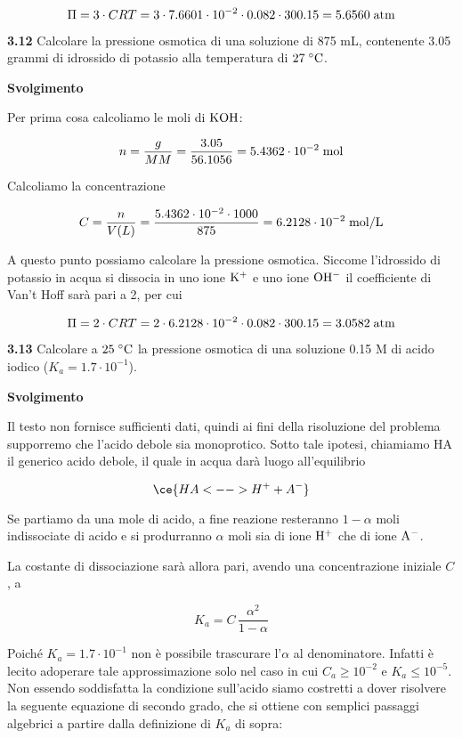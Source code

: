 $$\Pi=3 \cdot CRT
=3 \cdot 7.6601 \cdot 10^{-2} \cdot 0.082 \cdot 300.15
=5.6560 \; \rm atm$$

\vspace{0.2cm}\textbf{3.12} Calcolare la pressione osmotica di una soluzione di 875 mL, contenente 3.05 grammi di idrossido
di potassio alla temperatura di $27 \; \rm ^{\circ} C$.

\vspace{0.2cm}\large\textbf{Svolgimento}\normalsize

\vspace{0.2cm}Per prima cosa calcoliamo le moli di $\rm KOH$:

$$n=\frac{g}{MM}
=\frac{3.05}{56.1056}
=5.4362 \cdot 10^{-2} \; \rm mol$$

Calcoliamo la concentrazione

$$C=\frac{n}{V(L)}
=\frac{5.4362 \cdot 10^{-2} \cdot 1000}{875}
=6.2128 \cdot 10^{-2} \; \rm mol/L$$

A questo punto possiamo calcolare la pressione osmotica. Siccome l'idrossido di potassio in acqua si dissocia in uno ione $\rm K^{+}$ e uno ione $\rm OH^-$ il coefficiente di Van't Hoff sarà pari a 2, per cui

$$\Pi=2 \cdot CRT
=2 \cdot 6.2128 \cdot 10^{-2} \cdot 0.082 \cdot 300.15
=3.0582 \; \rm atm$$

\vspace{0.2cm}\textbf{3.13} Calcolare a $25 \; ^{\circ} \rm C$ la pressione osmotica di una soluzione 0.15 M di acido iodico ($K_a=1.7 \cdot 10^{-1}$).

\vspace{0.2cm}\large\textbf{Svolgimento}\normalsize

\vspace{0.2cm}Il testo non fornisce sufficienti dati, quindi ai fini della risoluzione del problema supporremo che l'acido debole sia monoprotico. Sotto tale ipotesi, chiamiamo HA il generico acido debole, il quale in acqua darà luogo all'equilibrio

$$\ce{HA <--> H^+ + A^-}$$

Se partiamo da una mole di acido, a fine reazione resteranno $1 - \alpha$ moli indissociate di acido e si produrranno $\alpha$ moli sia di ione $\rm H^+$ che di ione $\rm A^-$. 

La costante di dissociazione sarà allora pari, avendo una concentrazione iniziale $C$, a

$$K_a=C\,\frac{\alpha^2}{1-\alpha}$$

Poiché $K_a=1.7 \cdot 10^{-1}$ non è possibile trascurare l'$\alpha$ al denominatore. Infatti è lecito adoperare tale approssimazione solo nel caso in cui $C_a \geq 10^{-2}$ e $K_a \leq 10^{-5}$. Non essendo soddisfatta la condizione sull'acido siamo costretti a dover risolvere la seguente equazione di secondo grado, che si ottiene con semplici passaggi algebrici a partire dalla definizione di $K_a$ di sopra:

